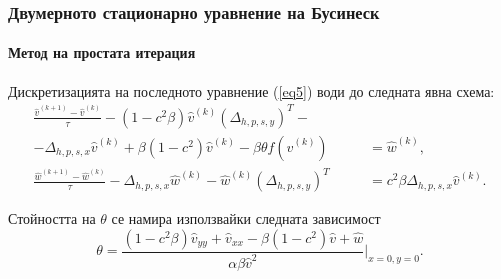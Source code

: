 \documentclass{beamer}
\newcommand{\rf}[1]{(\ref{#1})}
\begin{document}
\begin{frame}
\frametitle{Двумерното стационарно уравнение на Бусинеск}
\framesubtitle{Метод на простата итерация} 
Дискретизацията на последното уравнение \rf{eq5} води до следната явна схема:
\begin{equation}\label{eq555}
\begin{split}
\frac {\widehat{v}^{(k+1)}-\widehat{v}^{(k)}}{\tau}- (1-c^2 \beta) \widehat{v}^{(k)}  (\Delta_{h,p,s,y})^T - \quad\quad\quad\;&\\
-\Delta_{h,p,s,x}  \widehat{v}^{(k)}+ \beta (1-c^2 ) \widehat{v}^{(k)} - \beta \theta f(\widehat{v}^{(k)}) &= \widehat{w}^{(k)}, \\
\frac  {\widehat{w}^{(k+1)} -\widehat{w}^{(k)}} {\tau} - \Delta_{h,p,s,x}  \widehat{w}^{(k)} - \widehat{w}^{(k)}  (\Delta_{h,p,s,y})^T &=  c^2 \beta \Delta_{h,p,s,x}  \widehat{v}^{(k)}.
\end{split}
\end{equation}

Стойността на $\theta$ се намира използвайки следната зависимост
\begin{equation}\label{eqtheta}
\theta = \frac{ (1-c^2 \beta) \widehat{v}_{yy} + \widehat{v}_{xx} - \beta (1-c^2) \widehat{v} +\widehat{w}}{\alpha \beta \widehat{v}^2 } |_{x=0,y=0}.
\end{equation}
\end{frame}
\end{document}
